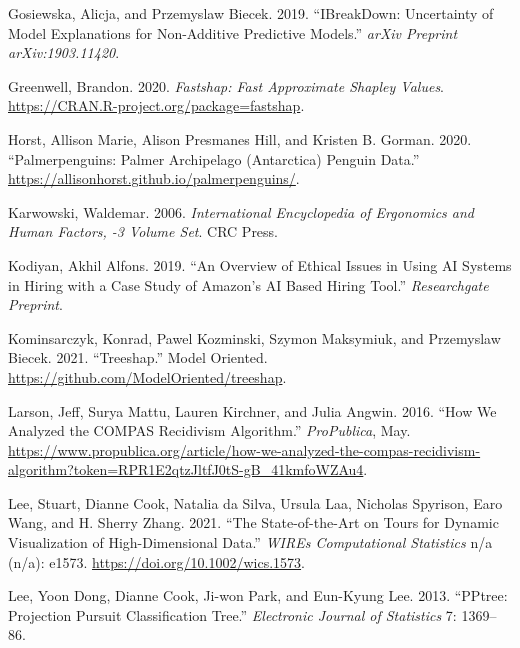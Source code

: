\documentclass[
]{article}
\newlength{\cslhangindent}
\newlength{\cslentryspacingunit} %
\newenvironment{CSLReferences}[2] %
 {%
  \setlength{\parindent}{0pt}
  \ifodd #1
  \let\oldpar\par
  \def\par{\hangindent=\cslhangindent\oldpar}
  \fi
  \setlength{\parskip}{#2\cslentryspacingunit}
 }%
 {}
\begin{document}
\begin{CSLReferences}{1}{0}
\leavevmode{}%
Gosiewska, Alicja, and Przemyslaw Biecek. 2019. {``{IBreakDown}: {Uncertainty} of Model Explanations for Non-Additive Predictive Models.''} \emph{arXiv Preprint arXiv:1903.11420}.

\leavevmode{}%
Greenwell, Brandon. 2020. \emph{Fastshap: {Fast} {Approximate} {Shapley} {Values}}. \url{https://CRAN.R-project.org/package=fastshap}.

\leavevmode{}%
Horst, Allison Marie, Alison Presmanes Hill, and Kristen B. Gorman. 2020. {``Palmerpenguins: {Palmer} {Archipelago} ({Antarctica}) Penguin Data.''} \url{https://allisonhorst.github.io/palmerpenguins/}.

\leavevmode{}%
Karwowski, Waldemar. 2006. \emph{International {Encyclopedia} of {Ergonomics} and {Human} {Factors}, -3 {Volume} {Set}}. CRC Press.

\leavevmode{}%
Kodiyan, Akhil Alfons. 2019. {``An Overview of Ethical Issues in Using {AI} Systems in Hiring with a Case Study of {Amazon}'s {AI} Based Hiring Tool.''} \emph{Researchgate Preprint}.

\leavevmode{}%
Kominsarczyk, Konrad, Pawel Kozminski, Szymon Maksymiuk, and Przemyslaw Biecek. 2021. {``Treeshap.''} Model Oriented. \url{https://github.com/ModelOriented/treeshap}.

\leavevmode{}%
Larson, Jeff, Surya Mattu, Lauren Kirchner, and Julia Angwin. 2016. {``How {We} {Analyzed} the {COMPAS} {Recidivism} {Algorithm}.''} \emph{ProPublica}, May. \url{https://www.propublica.org/article/how-we-analyzed-the-compas-recidivism-algorithm?token=RPR1E2qtzJltfJ0tS-gB_41kmfoWZAu4}.

\leavevmode{}%
Lee, Stuart, Dianne Cook, Natalia da Silva, Ursula Laa, Nicholas Spyrison, Earo Wang, and H. Sherry Zhang. 2021. {``The State-of-the-Art on Tours for Dynamic Visualization of High-Dimensional Data.''} \emph{WIREs Computational Statistics} n/a (n/a): e1573. \url{https://doi.org/10.1002/wics.1573}.

\leavevmode{}%
Lee, Yoon Dong, Dianne Cook, Ji-won Park, and Eun-Kyung Lee. 2013. {``{PPtree}: {Projection} Pursuit Classification Tree.''} \emph{Electronic Journal of Statistics} 7: 1369--86.


\end{CSLReferences}
\end{document}
